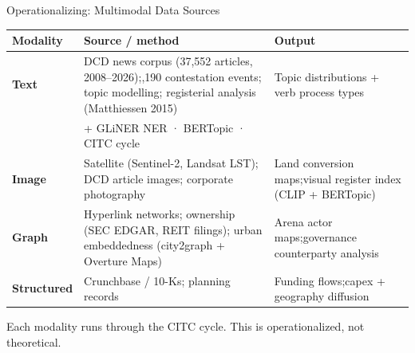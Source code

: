 \documentclass[aspectratio=169,12pt]{beamer}
\begin{document}
\begin{frame}[shrink=5]{Operationalizing: Multimodal Data Sources}
\vspace{0.1em}
{\footnotesize
\begin{tabularx}{\textwidth}{@{}lXX@{}}
  \toprule
  \textbf{Modality} & \textbf{Source / method} & \textbf{Output} \\
  \midrule
  \textbf{Text} &
    DCD news corpus (37,552 articles, 2008--2026);\newline
    1,190 contestation events; topic modelling;\newline
    registerial analysis (Matthiessen 2015) &
    Topic distributions + verb process types\\
    & \textcolor{tufteRule}{\scriptsize + GLiNER NER · BERTopic · CITC cycle} & \\
  \addlinespace[3pt]
  \textbf{Image} &
    Satellite (Sentinel-2, Landsat LST);\newline
    DCD article images; corporate photography &
    Land conversion maps;\newline visual register index (CLIP + BERTopic)\\
  \addlinespace[3pt]
  \textbf{Graph} &
    Hyperlink networks; ownership (SEC EDGAR, REIT filings);\newline
    urban embeddedness (city2graph + Overture Maps) &
    Arena actor maps;\newline governance counterparty analysis\\
  \addlinespace[3pt]
  \textbf{Structured} &
    Crunchbase / 10-Ks; planning records &
    Funding flows;\newline capex + geography diffusion\\
  \bottomrule
\end{tabularx}}
\vspace{0.3em}
\footnotesize\textcolor{tufteRule}{Each modality runs through the CITC cycle. This is operationalized, not theoretical.}
\end{frame}
\end{document}
